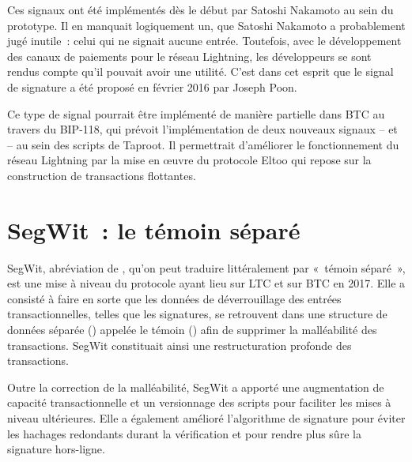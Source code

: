 
Ces signaux ont été implémentés dès le début par Satoshi Nakamoto au sein du prototype. Il en manquait logiquement un, que Satoshi Nakamoto a probablement jugé inutile~: celui qui ne signait aucune entrée. Toutefois, avec le développement des canaux de paiements pour le réseau Lightning, les développeurs se sont rendus compte qu'il pouvait avoir une utilité. C'est dans cet esprit que le signal de signature  a été proposé en février 2016 par Joseph Poon.

Ce type de signal pourrait être implémenté de manière partielle dans BTC au travers du BIP-118, qui prévoit l'implémentation de deux nouveaux signaux --  et  -- au sein des scripts de Taproot. Il permettrait d'améliorer le fonctionnement du réseau Lightning par la mise en œuvre du protocole Eltoo qui repose sur la construction de transactions flottantes.

\section*{SegWit~: le témoin séparé}

SegWit, abréviation de , qu'on peut traduire littéralement par «~témoin séparé~», est une mise à niveau du protocole ayant lieu sur LTC et sur BTC en 2017. Elle a consisté à faire en sorte que les données de déverrouillage des entrées transactionnelles, telles que les signatures, se retrouvent dans une structure de données séparée () appelée le témoin () afin de supprimer la malléabilité des transactions. SegWit constituait ainsi une restructuration profonde des transactions.

Outre la correction de la malléabilité, SegWit a apporté une augmentation de capacité transactionnelle et un versionnage des scripts pour faciliter les mises à niveau ultérieures. Elle a également amélioré l'algorithme de signature pour éviter les hachages redondants durant la vérification et pour rendre plus sûre la signature hors-ligne.

